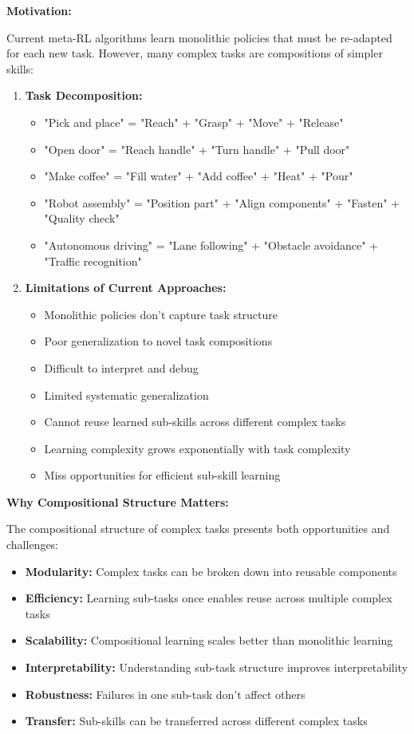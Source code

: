 \documentclass[12pt]{article}
\newcommand{\ieee}[1]{\textcolor{IEEEBlue}{\textbf{#1}}}
\begin{document}
{{			\ieee{Motivation:}
			
			Current meta-RL algorithms learn monolithic policies that must be re-adapted for each new task. However, many complex tasks are compositions of simpler skills:
			
			\begin{enumerate}
				\item \textbf{Task Decomposition:}
				\begin{itemize}
					\item "Pick and place" = "Reach" + "Grasp" + "Move" + "Release"
					\item "Open door" = "Reach handle" + "Turn handle" + "Pull door"
					\item "Make coffee" = "Fill water" + "Add coffee" + "Heat" + "Pour"
					\item "Robot assembly" = "Position part" + "Align components" + "Fasten" + "Quality check"
					\item "Autonomous driving" = "Lane following" + "Obstacle avoidance" + "Traffic recognition"
				\end{itemize}
				
				\item \textbf{Limitations of Current Approaches:}
				\begin{itemize}
					\item Monolithic policies don't capture task structure
					\item Poor generalization to novel task compositions
					\item Difficult to interpret and debug
					\item Limited systematic generalization
					\item Cannot reuse learned sub-skills across different complex tasks
					\item Learning complexity grows exponentially with task complexity
					\item Miss opportunities for efficient sub-skill learning
				\end{itemize}
			\end{enumerate}
			
			\ieee{Why Compositional Structure Matters:}
			
			The compositional structure of complex tasks presents both opportunities and challenges:
			
			\begin{itemize}
				\item \textbf{Modularity:} Complex tasks can be broken down into reusable components
				\item \textbf{Efficiency:} Learning sub-tasks once enables reuse across multiple complex tasks
				\item \textbf{Scalability:} Compositional learning scales better than monolithic learning
				\item \textbf{Interpretability:} Understanding sub-task structure improves interpretability
				\item \textbf{Robustness:} Failures in one sub-task don't affect others
				\item \textbf{Transfer:} Sub-skills can be transferred across different complex tasks
			\end{itemize}
			
}}
\end{document}

